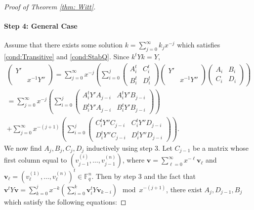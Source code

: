 \documentclass[11pt,a4paper,reqno]{amsart}
\theoremstyle{definition}
\theoremstyle{remark}
\numberwithin{equation}{section}
\begin{document}
\begin{proof}[Proof of Theorem \ref{thm: Witt}]
    \paragraph{\textbf{Step 4: General Case}} Assume that there exists some solution $k=\sum_{j=0}^{\infty}k_jx^{-j}$ which satisfies \eqref{cond:Transitive} and \eqref{cond:StabQ}. Since $k^tYk=Y$, 
    \begin{equation}
    \begin{split}
        \begin{pmatrix}
            Y'&\\
            &x^{-1}Y''
        \end{pmatrix}=\sum_{j=0}^{\infty}x^{-j}\left(\sum_{i=0}^j\begin{pmatrix}
            A_i^t&C_i^t\\
            B_i^t&D_i^t
        \end{pmatrix}\begin{pmatrix}
            Y'&\\
            &x^{-1}Y''
        \end{pmatrix}\begin{pmatrix}
            A_i&B_i\\
            C_i&D_i
        \end{pmatrix}\right)\\
        =\sum_{j=0}^{\infty}x^{-j}\left(\sum_{i=0}^j\begin{pmatrix}
            A_i^tY'A_{j-i}&A_i^tY'B_{j-i}\\
            B_i^tY'A_{j-i}&B_i^tY'B_{j-i}
        \end{pmatrix}\right)\\
        +\sum_{j=0}^{\infty}x^{-(j+1)}\left(\sum_{i=0}^j\begin{pmatrix}
            C_i^tY''C_{j-i}&C_i^tY''D_{j-i}\\
            D_i^tY''C_{j-i}&D_i^tY''D_{j-i}
        \end{pmatrix}\right).
    \end{split}    
    \end{equation}
    We now find $A_j,B_j,C_j,D_j$ inductively using step 3. Let $C_{j-1}$ be a matrix whose first column equal to $(v_{j-1}^{(i)},\dots,v_{j-1}^{(n)})$, where $\mathbf{v}=\sum_{\ell=0}^{\infty}x^{-\ell}\mathbf{v}_\ell$ and $\mathbf{v}_\ell=(v_\ell^{(1)},\dots,v_{\ell}^{(n)})^t\in \mathbb{F}_q^n$. Then by step 3 and the fact that $\mathbf{v}^tY\mathbf{v}=\sum_{k=0}^jx^{-k}\left(\sum_{i=0}^k\mathbf{v}_i^tY\mathbf{v}_{k-i}\right)\mod x^{-(j+1)}$, there exist $A_j,D_{j-1},B_j$ which satisfy the following equations:

\end{proof}
\end{document}
